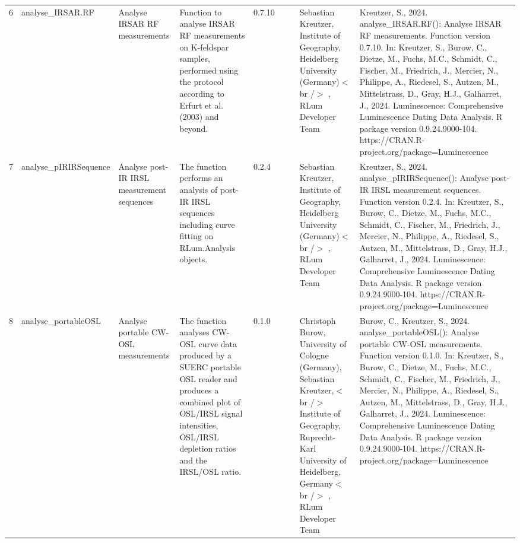 \begin{table}[ht]
\begin{tabular}{rllllllll}
  6 & analyse\_IRSAR.RF & Analyse IRSAR RF measurements & Function to analyse IRSAR RF measurements on K-feldspar samples, performed using the protocol according to Erfurt et al. (2003) and beyond. & 0.7.10
 &  &  & Sebastian Kreutzer, Institute of Geography, Heidelberg University (Germany)$<$br /$>$ , RLum Developer Team & Kreutzer, S., 2024. analyse\_IRSAR.RF(): Analyse IRSAR RF measurements. Function version 0.7.10. In: Kreutzer, S., Burow, C., Dietze, M., Fuchs, M.C., Schmidt, C., Fischer, M., Friedrich, J., Mercier, N., Philippe, A., Riedesel, S., Autzen, M., Mittelstrass, D., Gray, H.J., Galharret, J., 2024. Luminescence: Comprehensive Luminescence Dating Data Analysis. R package version 0.9.24.9000-104. https://CRAN.R-project.org/package=Luminescence
 \\ 
  7 & analyse\_pIRIRSequence & Analyse post-IR IRSL measurement sequences & The function performs an analysis of post-IR IRSL sequences including curve fitting on  RLum.Analysis  objects. & 0.2.4
 &  &  & Sebastian Kreutzer, Institute of Geography, Heidelberg University (Germany)$<$br /$>$ , RLum Developer Team & Kreutzer, S., 2024. analyse\_pIRIRSequence(): Analyse post-IR IRSL measurement sequences. Function version 0.2.4. In: Kreutzer, S., Burow, C., Dietze, M., Fuchs, M.C., Schmidt, C., Fischer, M., Friedrich, J., Mercier, N., Philippe, A., Riedesel, S., Autzen, M., Mittelstrass, D., Gray, H.J., Galharret, J., 2024. Luminescence: Comprehensive Luminescence Dating Data Analysis. R package version 0.9.24.9000-104. https://CRAN.R-project.org/package=Luminescence
 \\ 
  8 & analyse\_portableOSL & Analyse portable CW-OSL measurements & The function analyses CW-OSL curve data produced by a SUERC portable OSL reader and produces a combined plot of OSL/IRSL signal intensities, OSL/IRSL depletion ratios and the IRSL/OSL ratio. & 0.1.0
 &  &  & Christoph Burow, University of Cologne (Germany), Sebastian Kreutzer,$<$br /$>$ Institute of Geography, Ruprecht-Karl University of Heidelberg, Germany$<$br /$>$ , RLum Developer Team & Burow, C., Kreutzer, S., 2024. analyse\_portableOSL(): Analyse portable CW-OSL measurements. Function version 0.1.0. In: Kreutzer, S., Burow, C., Dietze, M., Fuchs, M.C., Schmidt, C., Fischer, M., Friedrich, J., Mercier, N., Philippe, A., Riedesel, S., Autzen, M., Mittelstrass, D., Gray, H.J., Galharret, J., 2024. Luminescence: Comprehensive Luminescence Dating Data Analysis. R package version 0.9.24.9000-104. https://CRAN.R-project.org/package=Luminescence
 \\ 

\end{tabular}
\end{table}
